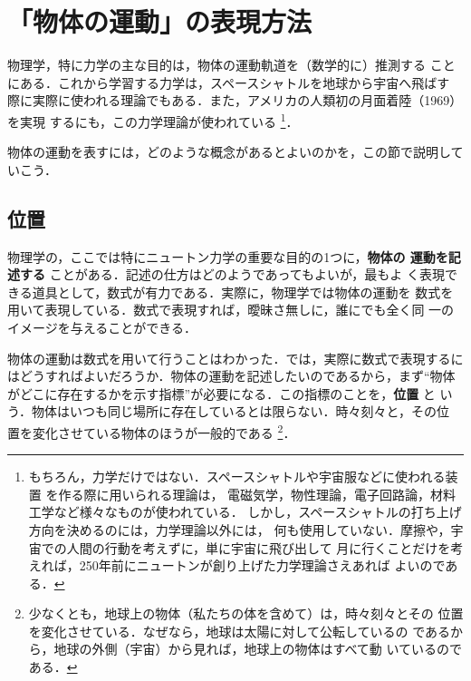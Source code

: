     \section{「物体の運動」の表現方法}
    \begin{mycomment}
        物理学，特に力学の主な目的は，物体の運動軌道を（数学的に）推測する
        ことにある．これから学習する力学は，スペースシャトルを地球から宇宙へ飛ばす
        際に実際に使われる理論でもある．また，アメリカの人類初の月面着陸（1969）を実現
        するにも，この力学理論が使われている
            \footnote{
                もちろん，力学だけではない．スペースシャトルや宇宙服などに使われる装置
                を作る際に用いられる理論は，
                電磁気学，物性理論，電子回路論，材料工学など様々なものが使われている．
                しかし，スペースシャトルの打ち上げ方向を決めるのには，力学理論以外には，
                何も使用していない．摩擦や，宇宙での人間の行動を考えずに，単に宇宙に飛び出して
                月に行くことだけを考えれば，250年前にニュートンが創り上げた力学理論さえあれば
                よいのである．
            }．

       物体の運動を表すには，どのような概念があるとよいのかを，この節で説明していこう．
    \end{mycomment}
        \subsection{位置}
        物理学の，ここでは特にニュートン力学の重要な目的の1つに，\textbf{物体の
        運動を記述する} ことがある．記述の仕方はどのようであってもよいが，最もよ
        く表現できる道具として，数式が有力である．実際に，物理学では物体の運動を
        数式を用いて表現している．数式で表現すれば，曖昧さ無しに，誰にでも全く同
        一のイメージを与えることができる．

        物体の運動は数式を用いて行うことはわかった．では，実際に数式で表現するに
        はどうすればよいだろうか．物体の運動を記述したいのであるから，まず“物体
        がどこに存在するかを示す指標”が必要になる．この指標のことを，\textbf{位置} と
        いう．物体はいつも同じ場所に存在しているとは限らない．時々刻々と，その位
        置を変化させている物体のほうが一般的である
            \footnote{
                少なくとも，地球上の物体（私たちの体を含めて）は，時々刻々とその
                位置を変化させている．なぜなら，地球は太陽に対して公転しているの
                であるから，地球の外側（宇宙）から見れば，地球上の物体はすべて動
                いているのである．
            }．

